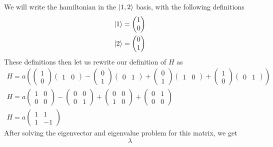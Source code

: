 \documentclass[]{article}
\begin{document}
We will write the hamiltonian in the \(\ket{1,2}\) basis, with the
following definitions \[
\begin{align}
\ket{1}  = \begin{pmatrix}
1 \\
0  
\end{pmatrix} \\
\ket{2} =\begin{pmatrix}
0 \\
1
\end{pmatrix}
\end{align}
\] These definitions then let us rewrite our definition of \(H\) as \[
\begin{align}
H = a\left( \begin{pmatrix}
1 \\ 0
\end{pmatrix}\begin{pmatrix}
1 &
0
\end{pmatrix}-\begin{pmatrix}
0 \\ 1
\end{pmatrix}\begin{pmatrix}
0 &
1
\end{pmatrix} +\begin{pmatrix}
0 \\ 1
\end{pmatrix}\begin{pmatrix}
1 &
0
\end{pmatrix}+\begin{pmatrix}
1 \\
0
\end{pmatrix}\begin{pmatrix}
0 &
1
\end{pmatrix}\right)  \\
H =a\begin{pmatrix}
1 & 0 \\
0  & 0
\end{pmatrix}-\begin{pmatrix}
0 & 0 \\
0 & 1
\end{pmatrix}+\begin{pmatrix}
0 & 0 \\
1 & 0
\end{pmatrix}+\begin{pmatrix}
0 & 1 \\
0  & 0
\end{pmatrix} \\
H = a\begin{pmatrix}
1 & 1 \\
1 & -1
\end{pmatrix}
\end{align}
\] After solving the eigenvector and eigenvalue problem for this matrix,
we get \[
\lambda
\]
\end{document}
